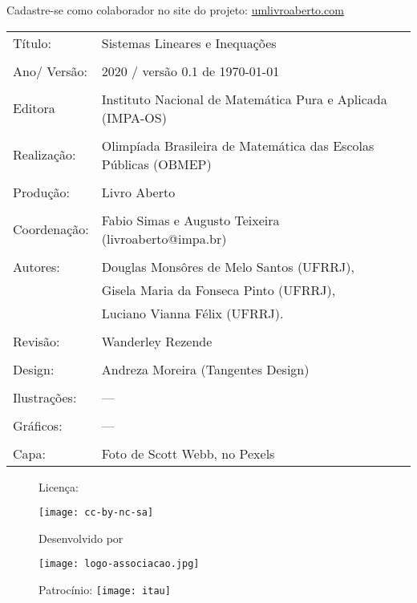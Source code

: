 \vspace*{.3cm}

Cadastre-se como colaborador no site do projeto: \url{umlivroaberto.com}




\begin{tabular}{p{}p{}}
Título: & Sistemas Lineares e Inequações\\
\\
Ano/ Versão: & 2020 / versão 0.1 de \today\\
\\
Editora & Instituto Nacional de Matem\'atica Pura e Aplicada (IMPA-OS)\\
\\
Realização:& Olimp\'iada Brasileira de Matem\'atica das Escolas P\'ublicas (OBMEP)\\
\\
Produção:& Livro Aberto\\
\\
Coordenação:& Fabio Simas e Augusto Teixeira (livroaberto@impa.br)\\
\\
  Autores: & Douglas Monsôres de Melo Santos (UFRRJ),\\
        & Gisela Maria da Fonseca Pinto (UFRRJ),\\
             & Luciano Vianna Félix (UFRRJ).\\
\\
Revisão: & Wanderley Rezende \\
\\
Design: & Andreza Moreira (Tangentes Design) \\
\\
  Ilustrações: & --- \\ 
\\
Gráficos: & --- \\
\\
  Capa: & Foto de Scott Webb, no Pexels \\

\end{tabular}

\begin{figure}[b]
\begin{minipage}[l]{5cm}
\centering

{\large Licença:}

  \texttt{[image: cc-by-nc-sa]}
\end{minipage}\hfill
\begin{minipage}[c]{5cm}
\centering
{\large Desenvolvido por}

\texttt{[image: logo-associacao.jpg]}
\end{minipage}
\begin{minipage}[r]{5cm}
\centering

{\large Patrocínio:}
  \vspace{1em}
  \texttt{[image: itau]}
\end{minipage}
\end{figure}

